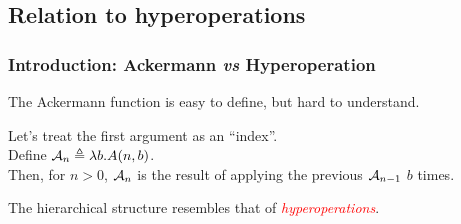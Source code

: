 \subsection*{Relation to hyperoperations}

%
%
%
%
%
%


\begin{frame}
\frametitle{Introduction: Ackermann \emph{vs} Hyperoperation}

\pause 
The Ackermann function is easy to define, but hard to
understand.

\bigskip

\pause 	
Let's treat the first argument as an ``index''. 
\\Define $\mathcal{A}_n \triangleq \lambda b.A(n,b)$. 
\\Then, for $n>0$, $\mathcal{A}_n$ is the result of applying the previous $\mathcal{A}_{n-1}$ $b$ times.


\bigskip

\pause 
The hierarchical structure resembles that of \textcolor{red}{\emph{hyperoperations}}.


\end{frame}


